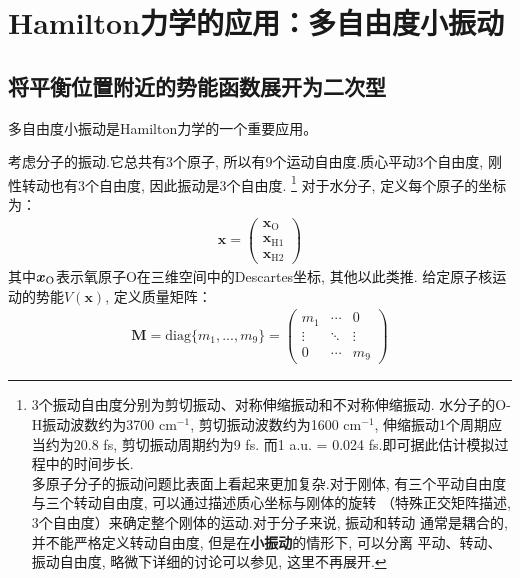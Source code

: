     \section{Hamilton力学的应用：多自由度小振动}
    \subsection{将平衡位置附近的势能函数展开为二次型}
    多自由度小振动是Hamilton力学的一个重要应用。
    
    考虑分子的振动.它总共有3个原子, 所以有9个运动自由度.质心平动3个自由度, 
    刚性转动也有3个自由度, 因此振动是3个自由度.
    \footnote{
    3个振动自由度分别为剪切振动、对称伸缩振动和不对称伸缩振动.
    水分子的O-H振动波数约为3700 cm$^{-1}$, 剪切振动波数约为1600 cm$^{-1}$, 
    伸缩振动1个周期应当约为20.8 fs, 剪切振动周期约为9 fs. 而1 a.u. = 0.024 fs.即可据此估计模拟过程中的时间步长.\\
    多原子分子的振动问题比表面上看起来更加复杂.对于刚体, 
    有三个平动自由度与三个转动自由度, 可以通过描述质心坐标与刚体的旋转
    （特殊正交矩阵描述, 3个自由度）来确定整个刚体的运动.对于分子来说, 振动和转动
    通常是耦合的, 并不能严格定义转动自由度, 但是在\textbf{小振动}的情形下, 可以分离
    平动、转动、振动自由度, 略微下详细的讨论可以参见\cite{Landau2007mechanics}, 
    这里不再展开.
    }
    对于水分子, 定义每个原子的坐标为：
    \begin{equation}
        \begin{split}
        \bm{x} = 
        \begin{pmatrix}
            \bm{x}_\mathrm{O}\\
            \bm{x}_{\mathrm{H1}}\\
            \bm{x}_{\mathrm{H2}}
        \end{pmatrix}
    \end{split}
    \end{equation}
    其中$\bm{x}_{\mathrm{O}}$表示氧原子O在三维空间中的Descartes坐标, 其他以此类推.
    给定原子核运动的势能$V(\bm{x})$, 定义质量矩阵：
    \begin{equation}
        \begin{split}
        \bm{M} = \mathrm{diag} \{m_1,...,m_9 \} = 
        \begin{pmatrix}
            m_1 & \cdots & 0\\
            \vdots & \ddots & \vdots\\
            0 & \cdots & m_9
        \end{pmatrix}
        \label{mass matrix}
    \end{split}
    \end{equation}
